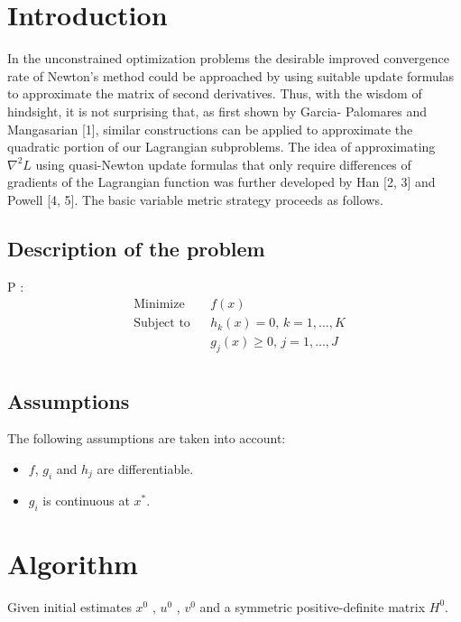 \documentclass{article}
\begin{document}
\section{Introduction}

In the unconstrained optimization problems the desirable improved convergence rate of Newton’s method could be approached by using suitable update formulas to approximate the matrix of second derivatives. Thus, with the wisdom of hindsight, it is not surprising that, as first shown by Garcia- Palomares and Mangasarian [1], similar constructions can be applied to approximate the quadratic portion of our Lagrangian subproblems. The idea of approximating $\nabla^2L$ using quasi-Newton update formulas that only require differences of gradients of the Lagrangian function was further developed by Han [2, 3] and Powell [4, 5]. The basic variable metric strategy proceeds as follows.

\subsection{Description of the problem}
P :
\begin{equation*}
    \begin{aligned}
        & \text{Minimize}
        & & f(x) \\
        & \text{Subject to}
        & & h_k(x) = 0, \, k = 1, \ldots, K\\
        &&& g_j(x) \geq 0, \, j = 1, \ldots, J\\
    \end{aligned}
\end{equation*}


\subsection{Assumptions}
The following assumptions are taken into account:
\begin{itemize}
    \item $f$, $g_i$ and $h_j$ are differentiable.
    \item $g_i$ is continuous at $x^*$.
\end{itemize}

\section{Algorithm}

Given initial estimates $x^0$ , $u^0$ , $v^0$ and a symmetric positive-definite matrix $H^0$.\newline
\end{document}

